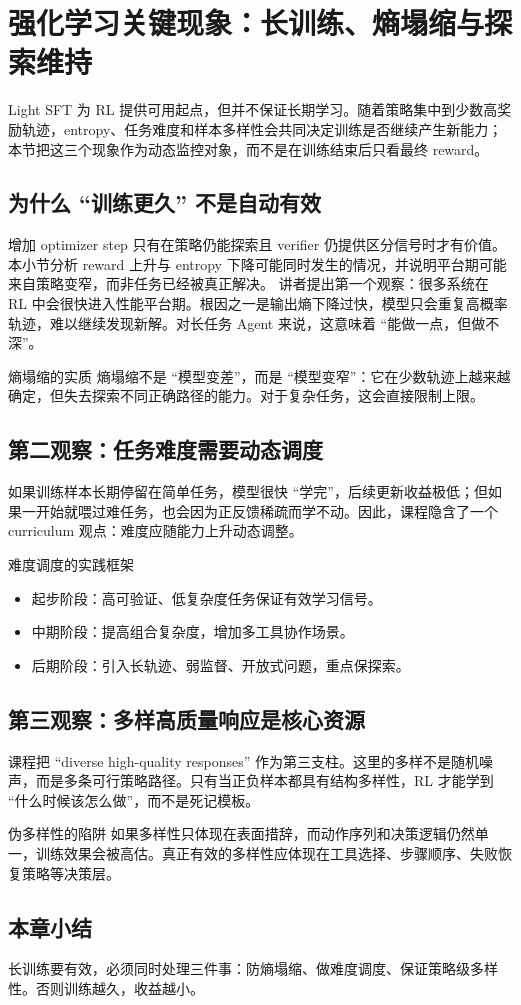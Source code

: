 \section{强化学习关键现象：长训练、熵塌缩与探索维持}

Light SFT 为 RL 提供可用起点，但并不保证长期学习。随着策略集中到少数高奖励轨迹，entropy、任务难度和样本多样性会共同决定训练是否继续产生新能力；本节把这三个现象作为动态监控对象，而不是在训练结束后只看最终 reward。

\subsection{为什么 ``训练更久'' 不是自动有效}
增加 optimizer step 只有在策略仍能探索且 verifier 仍提供区分信号时才有价值。本小节分析 reward 上升与 entropy 下降可能同时发生的情况，并说明平台期可能来自策略变窄，而非任务已经被真正解决。
讲者提出第一个观察：很多系统在 RL 中会很快进入性能平台期。根因之一是输出熵下降过快，模型只会重复高概率轨迹，难以继续发现新解。对长任务 Agent 来说，这意味着 ``能做一点，但做不深''。

\begin{importantbox}{熵塌缩的实质}
熵塌缩不是 ``模型变差''，而是 ``模型变窄''：它在少数轨迹上越来越确定，但失去探索不同正确路径的能力。对于复杂任务，这会直接限制上限。
\end{importantbox}

\subsection{第二观察：任务难度需要动态调度}
如果训练样本长期停留在简单任务，模型很快 ``学完''，后续更新收益极低；但如果一开始就喂过难任务，也会因为正反馈稀疏而学不动。因此，课程隐含了一个 curriculum 观点：难度应随能力上升动态调整。

\begin{knowledgebox}{难度调度的实践框架}
\begin{itemize}
    \item 起步阶段：高可验证、低复杂度任务保证有效学习信号。
    \item 中期阶段：提高组合复杂度，增加多工具协作场景。
    \item 后期阶段：引入长轨迹、弱监督、开放式问题，重点保探索。
\end{itemize}
\end{knowledgebox}

\subsection{第三观察：多样高质量响应是核心资源}
课程把 ``diverse high-quality responses'' 作为第三支柱。这里的多样不是随机噪声，而是多条可行策略路径。只有当正负样本都具有结构多样性，RL 才能学到 ``什么时候该怎么做''，而不是死记模板。

\begin{warningbox}{伪多样性的陷阱}
如果多样性只体现在表面措辞，而动作序列和决策逻辑仍然单一，训练效果会被高估。真正有效的多样性应体现在工具选择、步骤顺序、失败恢复策略等决策层。
\end{warningbox}

\subsection{本章小结}
长训练要有效，必须同时处理三件事：防熵塌缩、做难度调度、保证策略级多样性。否则训练越久，收益越小。

